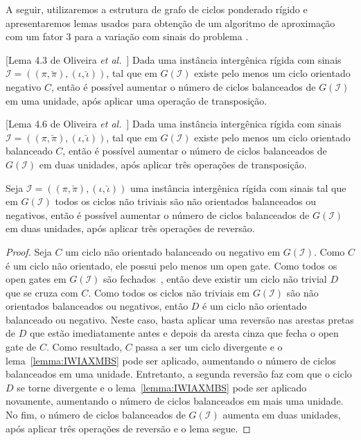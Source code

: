 A seguir, utilizaremos a estrutura de grafo de ciclos ponderado rígido e apresentaremos lemas usados para obtenção de um algoritmo de aproximação com um fator $3$ para a variação com sinais do problema \SbIRTI{}.

\begin{lemma}\label{lemma:CPUOKZAL}[Lema 4.3 de Oliveira \textit{et al.}~\cite{2021a-oliveira-etal}]
Dada uma instância intergênica rígida com sinais $\mathcal{I}=((\pi,\breve\pi),(\iota,\breve\iota))$, tal que em $G(\mathcal{I})$ existe pelo menos um ciclo orientado negativo $C$, então é possível aumentar o número de ciclos balanceados de $G(\mathcal{I})$ em uma unidade, após aplicar uma operação de transposição.
\end{lemma}

\begin{lemma}\label{lemma:PWBLLVMW}[Lema 4.6 de Oliveira \textit{et al.}~\cite{2021a-oliveira-etal}]
Dada uma instância intergênica rígida com sinais $\mathcal{I}=((\pi,\breve\pi),(\iota,\breve\iota))$, tal que em $G(\mathcal{I})$ existe pelo menos um ciclo orientado balanceado $C$, então é possível aumentar o número de ciclos balanceados de $G(\mathcal{I})$ em duas unidades, após aplicar três operações de transposição.
\end{lemma}

\begin{lemma}\label{lemma:JULWGGYC}
Seja $\mathcal{I} = ((\pi,\breve\pi),(\iota,\breve\iota))$ uma instância intergênica rígida com sinais tal que em $G(\mathcal{I})$ todos os ciclos não triviais são não orientados balanceados ou negativos, então é possível aumentar o número de ciclos balanceados de $G(\mathcal{I})$ em duas unidades, após aplicar três operações de reversão.
\end{lemma}
\begin{proof}
Seja $C$ um ciclo não orientado balanceado ou negativo em $G(\mathcal{I})$. Como $C$ é um ciclo não orientado, ele possui pelo menos um open gate. Como todos os open gates em $G(\mathcal{I})$ são fechados~\cite{1996-bafna-pevzner}, então deve existir um ciclo não trivial $D$ que se cruza com $C$. Como todos os ciclos não triviais em $G(\mathcal{I})$ são não orientados balanceados ou negativos, então $D$ é um ciclo não orientado balanceado ou negativo. Neste caso, basta aplicar uma reversão nas arestas pretas de $D$ que estão imediatamente antes e depois da aresta cinza que fecha o open gate de $C$. Como resultado, $C$ passa a ser um ciclo divergente e o lema~\ref{lemma:IWIAXMBS} pode ser aplicado, aumentando o número de ciclos balanceados em uma unidade. Entretanto, a segunda reversão faz com que o ciclo $D$ se torne divergente e o lema~\ref{lemma:IWIAXMBS} pode ser aplicado novamente, aumentando o número de ciclos balanceados em mais uma unidade. No fim, o número de ciclos balanceados de $G(\mathcal{I})$ aumenta em duas unidades, após aplicar três operações de reversão e o lema segue.
\end{proof}

